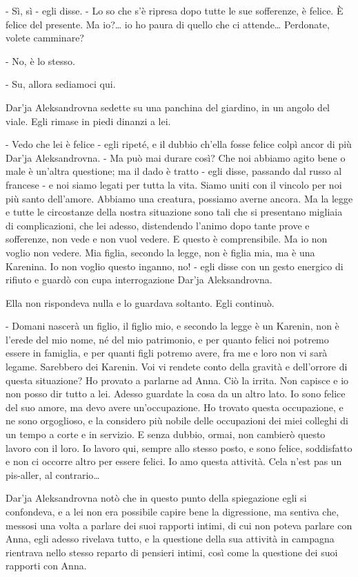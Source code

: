 - Sì, sì - egli disse. - Lo so che s'è ripresa dopo tutte le sue sofferenze, è felice. È felice del presente. Ma io?\ldots{} io ho paura di quello che ci attende\ldots{} Perdonate, volete camminare? 

- No, è lo stesso. 

- Su, allora sediamoci qui. 

Dar'ja Aleksandrovna sedette su una panchina del giardino, in un angolo del viale. Egli rimase in piedi dinanzi a lei. 

- Vedo che lei è felice - egli ripeté, e il dubbio ch'ella fosse felice colpì ancor di più Dar'ja Aleksandrovna. - Ma può mai durare così? Che noi abbiamo agito bene o male è un'altra questione; ma il dado è tratto - egli disse, passando dal russo al francese - e noi siamo legati per tutta la vita. Siamo uniti con il vincolo per noi più santo dell'amore. Abbiamo una creatura, possiamo averne ancora. Ma la legge e tutte le circostanze della nostra situazione sono tali che si presentano migliaia di complicazioni, che lei adesso, distendendo l'animo dopo tante prove e sofferenze, non vede e non vuol vedere. E questo è comprensibile. Ma io non voglio non vedere. Mia figlia, secondo la legge, non è figlia mia, ma è una Karenina. Io non voglio questo inganno, no! - egli disse con un gesto energico di rifiuto e guardò con cupa interrogazione Dar'ja Aleksandrovna. 

Ella non rispondeva nulla e lo guardava soltanto. Egli continuò. 

- Domani nascerà un figlio, il figlio mio, e secondo la legge è un Karenin, non è l'erede del mio nome, né del mio patrimonio, e per quanto felici noi potremo essere in famiglia, e per quanti figli potremo avere, fra me e loro non vi sarà legame. Sarebbero dei Karenin. Voi vi rendete conto della gravità e dell'orrore di questa situazione? Ho provato a parlarne ad Anna. Ciò la irrita. Non capisce e io non posso dir tutto a lei. Adesso guardate la cosa da un altro lato. Io sono felice del suo amore, ma devo avere un'occupazione. Ho trovato questa occupazione, e ne sono orgoglioso, e la considero più nobile delle occupazioni dei miei colleghi di un tempo a corte e in servizio. E senza dubbio, ormai, non cambierò questo lavoro con il loro. Io lavoro qui, sempre allo stesso posto, e sono felice, soddisfatto e non ci occorre altro per essere felici. Io amo questa attività. Cela n'est pas un pis-aller, al contrario\ldots{} 

Dar'ja Aleksandrovna notò che in questo punto della spiegazione egli si confondeva, e a lei non era possibile capire bene la digressione, ma sentiva che, messosi una volta a parlare dei suoi rapporti intimi, di cui non poteva parlare con Anna, egli adesso rivelava tutto, e la questione della sua attività in campagna rientrava nello stesso reparto di pensieri intimi, così come la questione dei suoi rapporti con Anna. 

